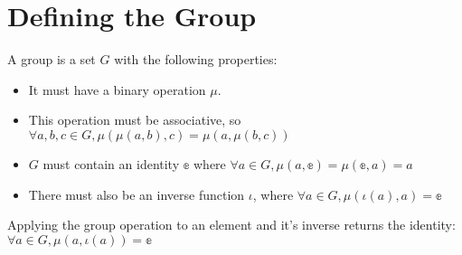 \section{Defining the Group}

\begin{definition}[Group]
    \label{definition : Group}
    \leanok
    A group is a set $G$ with the following properties:
    \begin{itemize}
        \item It must have a binary operation $\mu$.
        \item This operation must be associative, so $\forall a, b, c \in G, \mu(\mu(a, b), c) = \mu(a, \mu(b, c))$
        \item $G$ must contain an identity $\mathbb{e}$ where $\forall a \in G, \mu (a, \mathbb{e}) = \mu(\mathbb{e}, a) = a$
        \item There must also be an inverse function $\iota$, where $\forall a \in G, \mu(\iota(a), a) = \mathbb{e}$
    \end{itemize}
\end{definition}

\begin{theorem}
    \label{theorem : op_inv}
    \leanok
    Applying the group operation to an element and it's inverse returns the identity: $\forall a \in G, \mu(a, \iota(a)) = \mathbb{e}$
\end{theorem}
